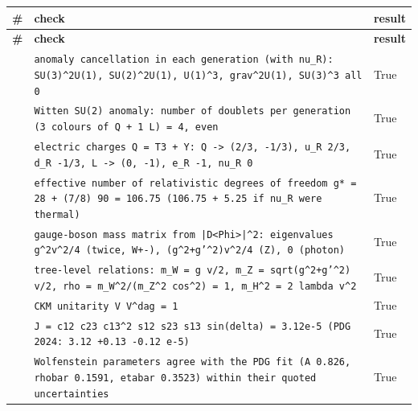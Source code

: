 \documentclass[10pt,a4paper]{article}
\begin{document}
{\footnotesize
\begin{longtable}{>{\raggedright\arraybackslash}p{}>{\raggedright\arraybackslash}p{}>{\raggedright\arraybackslash}p{}}
\toprule
\textbf{\#} & \textbf{check} & \textbf{result} \\
\midrule\endfirsthead
\toprule
\textbf{\#} & \textbf{check} & \textbf{result} \\
\midrule\endhead
\endfoot
\bottomrule\endlastfoot
1 & \texttt{anomaly cancellation in each generation (with nu\_\allowbreak{}R): SU(3)\textasciicircum{}2U(1), SU(2)\textasciicircum{}2U(1), U(1)\textasciicircum{}3, grav\textasciicircum{}2U(1), SU(3)\textasciicircum{}3 all 0} & True \\
2 & \texttt{Witten SU(2) anomaly: number of doublets per generation (3 colours of Q + 1 L) = 4, even} & True \\
3 & \texttt{electric charges Q = T3 + Y: Q -> (2/\allowbreak{}3, -1/\allowbreak{}3), u\_\allowbreak{}R 2/\allowbreak{}3, d\_\allowbreak{}R -1/\allowbreak{}3, L -> (0, -1), e\_\allowbreak{}R -1, nu\_\allowbreak{}R 0} & True \\
4 & \texttt{effective number of relativistic degrees of freedom g* = 28 + (7/\allowbreak{}8) 90 = 106.75 (106.75 + 5.25 if nu\_\allowbreak{}R were thermal)} & True \\
5 & \texttt{gauge-boson mass matrix from |D<Phi>|\textasciicircum{}2: eigenvalues g\textasciicircum{}2v\textasciicircum{}2/\allowbreak{}4 (twice, W+-), (g\textasciicircum{}2+g'\textasciicircum{}2)v\textasciicircum{}2/\allowbreak{}4 (Z), 0 (photon)} & True \\
6 & \texttt{tree-level relations: m\_\allowbreak{}W = g v/\allowbreak{}2, m\_\allowbreak{}Z = sqrt(g\textasciicircum{}2+g'\textasciicircum{}2) v/\allowbreak{}2, rho = m\_\allowbreak{}W\textasciicircum{}2/\allowbreak{}(m\_\allowbreak{}Z\textasciicircum{}2 cos\textasciicircum{}2) = 1, m\_\allowbreak{}H\textasciicircum{}2 = 2 lambda v\textasciicircum{}2} & True \\
7 & \texttt{CKM unitarity V V\textasciicircum{}dag = 1} & True \\
8 & \texttt{J = c12 c23 c13\textasciicircum{}2 s12 s23 s13 sin(delta) = 3.12e-5 (PDG 2024: 3.12 +0.13 -0.12 e-5)} & True \\
9 & \texttt{Wolfenstein parameters agree with the PDG fit (A 0.826, rhobar 0.1591, etabar 0.3523) within their quoted uncertainties} & True \\

\end{longtable}}
\end{document}

